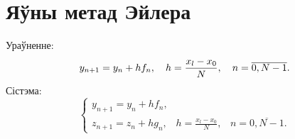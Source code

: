 \section{Яўны метад Эйлера}
Ураўненне:
\begin{equation}
    y_{n+1} = y_n + hf_n, \hspace{10pt} h = \frac{x_l-x_0}{N}, \hspace{10pt} n = \overline{0, N-1}. \\
\end{equation}
Сістэма:
\begin{equation}
	\begin{cases}
y_{n+1} = y_n + hf_n, \\
z_{n+1} = z_n + hg_n, \hspace{10pt} h = \frac{x_l-x_0}{N}, \hspace{10pt} n = \overline{0, N-1}.
	\end{cases}
\end{equation}
